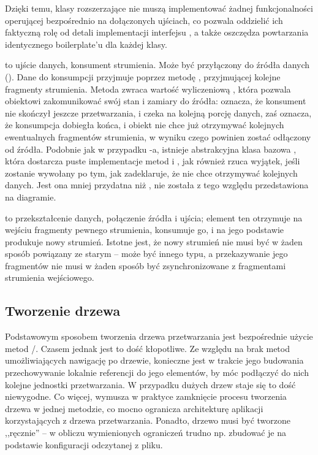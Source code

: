 Dzięki temu, klasy rozszerzające  nie muszą implementować żadnej
funkcjonalności operującej bezpośrednio na dołączonych ujściach, co pozwala oddzielić ich faktyczną
rolę od detali implementacji interfejsu , a także oszczędza powtarzania
identycznego boilerplate'u dla każdej klasy.

 to ujście danych, konsument strumienia. Może być przyłączony do źródła danych
(). Dane do konsumpcji przyjmuje poprzez metodę , przyjmującej kolejne
fragmenty strumienia. Metoda  zwraca wartość wyliczeniową , która pozwala
obiektowi zakomunikować swój stan i zamiary do źródła:  oznacza, że konsument nie
skończył jeszcze przetwarzania, i czeka na kolejną porcję danych, zaś  oznacza, że
konsumpcja dobiegła końca, i obiekt nie chce już otrzymywać kolejnych ewentualnych fragmentów
strumienia, w wyniku czego powinien zostać odłączony od źródła. Podobnie jak w przypadku
-a, istnieje abstrakcyjna klasa bazowa , która dostarcza
puste implementacje metod  i , jak również rzuca wyjątek, jeśli
 zostanie wywołany po tym, jak  zadeklaruje, że nie chce otrzymywać
kolejnych danych. Jest ona mniej przydatna niż , nie została z tego względu
przedstawiona na diagramie.

 to przekształcenie danych, połączenie źródła i ujścia; element ten otrzymuje na
wejściu fragmenty pewnego strumienia, konsumuje go, i na jego podstawie produkuje nowy strumień.
Istotne jest, że nowy strumień nie musi być w żaden sposób powiązany ze starym -- może być innego
typu, a przekazywanie jego fragmentów nie musi w żaden sposób być zsynchronizowane z fragmentami
strumienia wejściowego. 


\subsection{Tworzenie drzewa}

Podstawowym sposobem tworzenia drzewa przetwarzania jest bezpośrednie użycie metod
\slash {}. Czasem jednak jest to dość kłopotliwe. Ze względu na brak
metod umożliwiających nawigację po drzewie, konieczne jest w trakcie jego budowania przechowywanie
lokalnie referencji do jego elementów, by móc podłączyć do nich kolejne jednostki przetwarzania. W
przypadku dużych drzew staje się to dość niewygodne. Co więcej, wymusza w praktyce zamknięcie
procesu tworzenia drzewa w jednej metodzie, co mocno ogranicza architekturę aplikacji korzystających
z drzewa przetwarzania. Ponadto, drzewo musi być tworzone ,,ręcznie'' -- w obliczu wymienionych
ograniczeń trudno np. zbudować je na podstawie konfiguracji odczytanej z pliku. 

